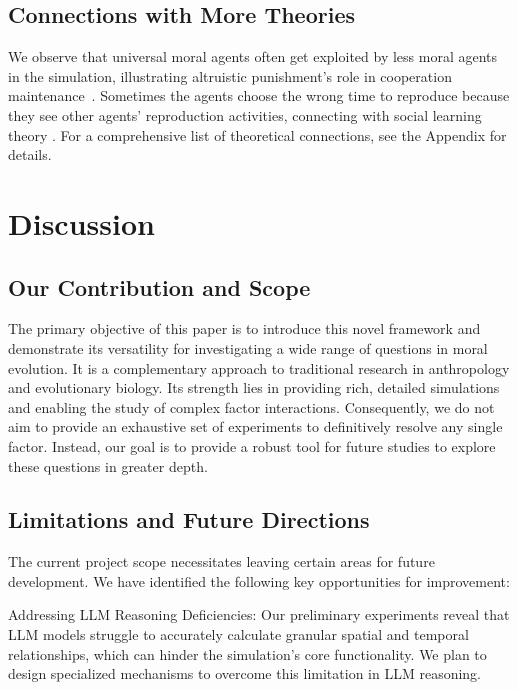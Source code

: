 \documentclass[letterpaper]{article} %
\begin{document}
\subsection{Connections with More Theories}

We observe that universal moral agents often get exploited by less moral agents in the simulation, illustrating altruistic punishment’s role in cooperation maintenance~\citep{fehr2002altruistic}. Sometimes the agents choose the wrong time to reproduce because they see other agents' reproduction activities, connecting with social learning theory \citep{bandura1977social}. For a comprehensive list of theoretical connections, see the Appendix for details.



\section{Discussion}
\subsection{Our Contribution and Scope}
The primary objective of this paper is to introduce this novel framework and demonstrate its versatility for investigating a wide range of questions in moral evolution. It is a complementary approach to traditional research in anthropology and evolutionary biology. Its strength lies in providing rich, detailed simulations and enabling the study of complex factor interactions. 
Consequently, we do not aim to provide an exhaustive set of experiments to definitively resolve any single factor. Instead, our goal is to provide a robust tool for future studies to explore these questions in greater depth. 

\subsection{Limitations and Future Directions}

The current project scope necessitates leaving certain areas for future development. We have identified the following key opportunities for improvement:

Addressing LLM Reasoning Deficiencies: Our preliminary experiments reveal that LLM models struggle to accurately calculate granular spatial and temporal relationships, which can hinder the simulation's core functionality. We plan to design specialized mechanisms to overcome this limitation in LLM reasoning.
\end{document}
